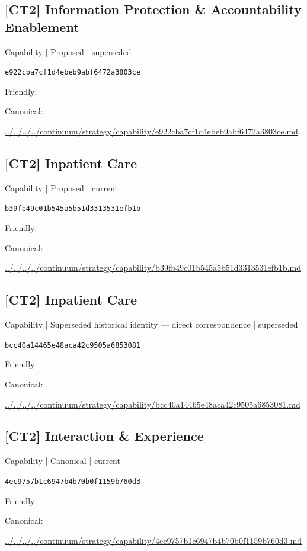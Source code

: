 \documentclass[10pt,a4paper]{article}
\begin{document}
\subsection*{[CT2] Information Protection \& Accountability Enablement}
{\small Capability | Proposed | superseded}\par
\texttt{e922cba7cf1d4ebeb9abf6472a3803ce}\par
Friendly: \par
Canonical: \par
{\footnotesize\url{../../../../continuum/strategy/capability/e922cba7cf1d4ebeb9abf6472a3803ce.md}}\par
\subsection*{[CT2] Inpatient Care}
{\small Capability | Proposed | current}\par
\texttt{b39fb49c01b545a5b51d3313531efb1b}\par
Friendly: \par
Canonical: \par
{\footnotesize\url{../../../../continuum/strategy/capability/b39fb49c01b545a5b51d3313531efb1b.md}}\par
\subsection*{[CT2] Inpatient Care}
{\small Capability | Superseded historical identity — direct correspondence | superseded}\par
\texttt{bcc40a14465e48aca42c9505a6853081}\par
Friendly: \par
Canonical: \par
{\footnotesize\url{../../../../continuum/strategy/capability/bcc40a14465e48aca42c9505a6853081.md}}\par
\subsection*{[CT2] Interaction \& Experience}
{\small Capability | Canonical | current}\par
\texttt{4ec9757b1c6947b4b70b0f1159b760d3}\par
Friendly: \par
Canonical: \par
{\footnotesize\url{../../../../continuum/strategy/capability/4ec9757b1c6947b4b70b0f1159b760d3.md}}\par
\end{document}
